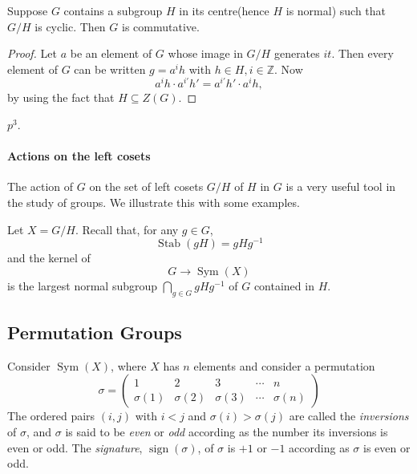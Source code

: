 \begin{lemma}
  Suppose \( G \) contains a subgroup \( H \) in its centre(hence \( H \) is normal) such that \( G / H \) is cyclic.
  Then \( G \) is commutative.
\end{lemma}
\begin{proof}
  Let \( a \) be an element of \( G \) whose image in \( G / H \) generates \( it \).
  Then every element of \( G \) can be written \( g = a^i h \) with \( h \in H, i \in \mathbb{Z} \).
  Now
  \[
    a^i h \cdot a^{i'} h' = a^{i'} h' \cdot a^i h,
  \]
  by using the fact that \( H \subseteq Z(G) \).
\end{proof}

\begin{example}
  \( p^3 \).
\end{example}

\paragraph{Actions on the left cosets}
The action of \( G \) on the set of left cosets \( G / H \) of \( H \) in \( G \) is a very useful tool in the study of groups.
We illustrate this with some examples.

Let \( X = G / H \). Recall that, for any \( g \in G \),
\[
  \operatorname{Stab}(gH) = g H g^{-1}
\]
and the kernel of
\[
  G \to \operatorname{Sym}(X)
\]
is the largest normal subgroup \( \bigcap_{g \in G} gH g^{-1} \) of \( G \) contained in \( H \).


\subsection{Permutation Groups}

Consider \( \operatorname{Sym}(X) \), where \( X \) has \( n \) elements and consider a permutation
\[
  \sigma = \begin{pmatrix}
    1 & 2 & 3 &\cdots &n\\
    \sigma(1) & \sigma(2) & \sigma(3) &\cdots & \sigma(n)
  \end{pmatrix}
\]
The ordered pairs \( (i, j) \) with \( i < j \) and \( \sigma(i) > \sigma(j) \) are called the \emph{inversions} of \( \sigma \), and \( \sigma \) is said to be \emph{even} or \emph{odd} according as the number its inversions is even or odd.
The \emph{signature}, \( \operatorname{sign}(\sigma) \), of \( \sigma \) is \( + 1 \) or \( -1 \) according as \( \sigma \) is even or odd.

